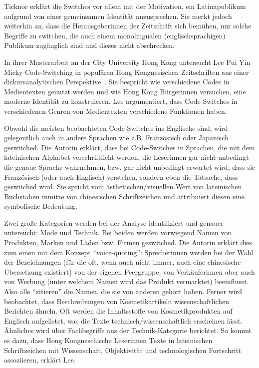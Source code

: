 Ticknor erklärt die Switches vor allem mit der Motivation, ein Latinapublikum aufgrund von einer gemeinsamen Identität anzusprechen.
Sie merkt jedoch weiterhin an, dass die Herausgeberinnen der Zeitschrift sich bemühen, nur solche Begriffe zu switchen, die auch einem monolingualen (englischsprachigen) Publikum zugänglich sind und dieses nicht abschrecken.



In ihrer Masterarbeit an der City University Hong Kong untersucht Lee Pui Yin Micky Code-Switching in populären Hong Kongnesischen Zeitschriften aus einer diskursanalytischen Perspektive~\cite[]{Lee99}.
Sie bespricht wie verschiedene Codes in Medientexten genutzt werden und wie Hong Kong Bürgerinnen versuchen, eine moderne Identität zu konstruieren.
Lee argumentiert, dass Code-Switches in verschiedenen Genren von Medientexten verschiedene Funktionen haben.

Obwohl die meisten beobachteten Code-Switches ins Englische sind, wird gelegentlich auch in andere Sprachen wie z.B. Französisch oder Japanisch geswitched.
Die Autorin erklärt, dass bei Code-Switches in Sprachen, die mit dem lateinischen Alphabet verschriftlicht werden, die Leserinnen gar nicht unbedingt die genaue Sprache wahrnehmen, bzw. gar nicht unbedingt erwartet wird, dass sie Französisch (oder auch Englisch) verstehen, sondern eben die Tatsache, dass geswitched wird.
Sie spricht vom ästhetischen/visuellen Wert von lateinischen Buchstaben inmitte von chinesischen Schriftzeichen und attribuiert diesen eine symbolische Bedeutung.

Zwei große Kategorien werden bei der Analyse identifiziert und genauer untersucht: Mode und Technik.
Bei beiden werden vorwiegend Namen von Produkten, Marken und Läden bzw. Firmen geswitched.
Die Autorin erklärt dies zum einen mit dem Konzept ``voice-quoting'': Sprecherinnen werden bei der Wahl der Bezeichnungen (für die oft, wenn auch nicht immer, auch eine chinesische Übersetzung existiert) von der eigenen Peergruppe, von Verkäuferinnen aber auch von Werbung (unter welchem Namen wird das Produkt vermarktet) beeinflusst.
Also alle ``zitieren'' die Namen, die sie von anderen gehört haben.
Ferner wird beobachtet, dass Beschreibungen von Kosmetikartikeln wissenschaftlichen Berichten ähneln.
Oft werden die Inhaltsstoffe von Kosmetikprodukten auf Englisch aufgelistet, was die Texte technisch/wissenschaftlich erscheinen lässt.
Ähnliches wird über Fachbegriffe aus der Technik-Kategorie berichtet.
So kommt es dazu, dass Hong Kongneschische Leserinnen Texte in lateinischen Schriftzeichen mit Wissenschaft, Objektivität und technologischen Fortschritt assoziieren, erklärt Lee.


